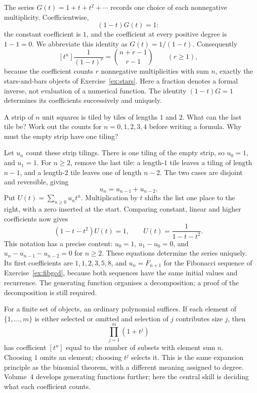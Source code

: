 \begin{examplex}
The series $G(t)=1+t+t^2+\cdots$ records one choice of each nonnegative multiplicity. Coefficientwise,
\[
(1-t)G(t)=1:
\]
the constant coefficient is $1$, and the coefficient at every positive degree is $1-1=0$. We abbreviate this identity as $G(t)=1/(1-t)$. Consequently
\[
[t^n]\frac1{(1-t)^r}=\binom{n+r-1}{r-1}\qquad(r\ge1),
\]
because the coefficient counts $r$ nonnegative multiplicities with sum $n$, exactly the stars-and-bars objects of Exercise~\ref{ex:stars}. Here a fraction denotes a formal inverse, not evaluation of a numerical function. The identity $(1-t)G=1$ determines its coefficients successively and uniquely.
\end{examplex}

\begin{think}
A strip of $n$ unit squares is tiled by tiles of lengths $1$ and $2$. What can the last tile be? Work out the counts for $n=0,1,2,3,4$ before writing a formula. Why must the empty strip have one tiling?
\end{think}

\begin{examplex}
Let $u_n$ count these strip tilings. There is one tiling of the empty strip, so $u_0=1$, and $u_1=1$. For $n\ge2$, remove the last tile: a length-$1$ tile leaves a tiling of length $n-1$, and a length-$2$ tile leaves one of length $n-2$. The two cases are disjoint and reversible, giving
\[
u_n=u_{n-1}+u_{n-2}.
\]
Put $U(t)=\sum_{n\ge0}u_nt^n$. Multiplication by $t$ shifts the list one place to the right, with a zero inserted at the start. Comparing constant, linear and higher coefficients now gives
\[
(1-t-t^2)U(t)=1,\qquad U(t)=\frac1{1-t-t^2}.
\]
This notation has a precise content: $u_0=1$, $u_1-u_0=0$, and $u_n-u_{n-1}-u_{n-2}=0$ for $n\ge2$. These equations determine the series uniquely. Its first coefficients are $1,1,2,3,5,8$, and $u_n=F_{n+1}$ for the Fibonacci sequence of Exercise~\ref{ex:fibgcd}, because both sequences have the same initial values and recurrence. The generating function organises a decomposition; a proof of the decomposition is still required.
\end{examplex}

For a finite set of objects, an ordinary polynomial suffices. If each element of $\{1,\dots,m\}$ is either selected or omitted and selection of $j$ contributes size $j$, then
\[
\prod_{j=1}^m(1+t^j)
\]
has coefficient $[t^n]$ equal to the number of subsets with element sum $n$. Choosing $1$ omits an element; choosing $t^j$ selects it. This is the same expansion principle as the binomial theorem, with a different meaning assigned to degree. Volume~4 develops generating functions further; here the central skill is deciding what each coefficient counts.

